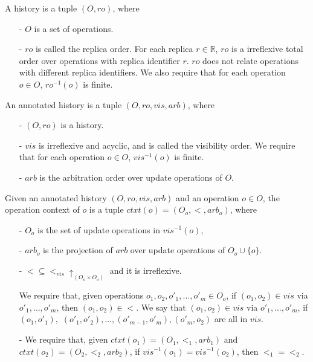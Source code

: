 A history is a tuple $(O,\mathit{ro})$, where

\begin{itemize}
\setlength{\itemsep}{0.5pt}
\item[-] $O$ is a set of operations.

\item[-] $\mathit{ro}$ is called the replica order. For each replica $r \in \mathbb{R}$, $\mathit{ro}$ is a irreflexive total order over operations with replica identifier $r$. $\mathit{ro}$ does not relate operations with different replica identifiers. We also require that for each operation $o \in O$, $\mathit{ro}^{-1}(o)$ is finite.
\end{itemize}

An annotated history is a tuple $(O,\mathit{ro},\mathit{vis},\mathit{arb})$, where

\begin{itemize}
\setlength{\itemsep}{0.5pt}
\item[-] $(O,\mathit{ro})$ is a history.

\item[-] $\mathit{vis}$ is irreflexive and acyclic, and is called the visibility order. We require that for each operation $o \in O$, $\mathit{vis}^{-1}(o)$ is finite.

\item[-] $\mathit{arb}$ is the arbitration order over update operations of $O$.
\end{itemize}


Given an annotated history $(O,\mathit{ro},\mathit{vis},\mathit{arb})$ and an operation $o \in O$, the operation context of $o$ is a tuple $ctxt(o)=(O_o,<,arb_o)$, where

\begin{itemize}
\setlength{\itemsep}{0.5pt}
\item[-] $O_o$ is the set of update operations in $\mathit{vis}^{-1}(o)$,

\item[-] $arb_o$ is the projection of $arb$ over update operations of $O_o \cup \{ o \}$.

\item[-] $< \subseteq <_{\mathit{vis}} \uparrow_{(O_o \times O_o)}$ and it is irreflexive.

We require that, given operations $o_1,o_2,o'_1,\ldots,o'_m \in O_o$, if $(o_1,o_2) \in \mathit{vis}$ via $o'_1,\ldots,o'_m$, then $(o_1,o_2) \in <$. We say that $(o_1,o_2) \in \mathit{vis}$ via $o'_1,\ldots,o'_m$, if $(o_1,o'_1),$ $(o'_1,o'_2), \ldots, (o'_{\mathit{m-1}},o'_m),(o'_m,o_2)$ are all in $\mathit{vis}$.

\item[-] {\color {red}We require that, given $ctxt(o_1)=(O_1,<_1,arb_1)$ and $ctxt(o_2)=(O_2,<_2,arb_2)$, if $\mathit{vis}^{-1}(o_1) = \mathit{vis}^{-1}(o_2)$, then $<_1 = <_2$.}
\end{itemize}

